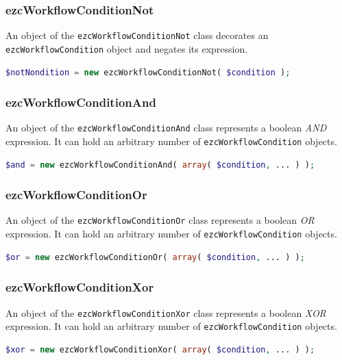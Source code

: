 \subsubsection{ezcWorkflowConditionNot}

An object of the \texttt{ezcWorkflowConditionNot} class decorates an
\texttt{ezcWorkflowCondition} object and negates its expression.

\begin{lstlisting}[language=PHP]
$notNondition = new ezcWorkflowConditionNot( $condition );
\end{lstlisting}

\subsubsection{ezcWorkflowConditionAnd}

An object of the \texttt{ezcWorkflowConditionAnd} class represents a
boolean \emph{AND} expression. It can hold an arbitrary number of
\texttt{ezcWorkflowCondition} objects.

\begin{lstlisting}[language=PHP]
$and = new ezcWorkflowConditionAnd( array( $condition, ... ) );
\end{lstlisting}

\subsubsection{ezcWorkflowConditionOr}

An object of the \texttt{ezcWorkflowConditionOr} class represents a
boolean \emph{OR} expression. It can hold an arbitrary number of
\texttt{ezcWorkflowCondition} objects.

\begin{lstlisting}[language=PHP]
$or = new ezcWorkflowConditionOr( array( $condition, ... ) );
\end{lstlisting}

\subsubsection{ezcWorkflowConditionXor}

An object of the \texttt{ezcWorkflowConditionXor} class represents a
boolean \emph{XOR} expression. It can hold an arbitrary number of
\texttt{ezcWorkflowCondition} objects.

\begin{lstlisting}[language=PHP]
$xor = new ezcWorkflowConditionXor( array( $condition, ... ) );
\end{lstlisting}

